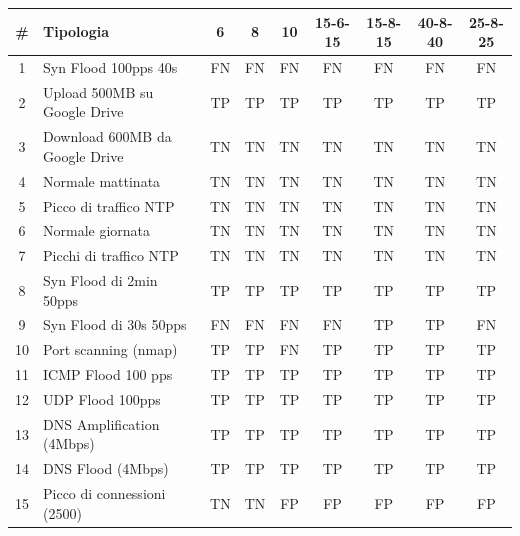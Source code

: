 \FloatBarrier
\begin{table}
    \begin{tabularx}{\textwidth}{||c X c c c c c c c||} 
        \hline
        \# & Tipologia & 6 & 8 & 10 & 15-6-15 & 15-8-15 & 40-8-40 & 25-8-25\\ [0.5ex] 
        \hline\hline
        1 & Syn Flood 100pps 40s & \cellcolor{magenta} FN & \cellcolor{magenta} FN & \cellcolor{magenta} FN & \cellcolor{magenta} FN & \cellcolor{magenta} FN & \cellcolor{magenta} FN & \cellcolor{magenta} FN\\ 
        \hline
        2 & Upload 500MB su Google Drive & TP & TP & TP & TP & TP & TP & TP \\ 
        \hline
        3 &  Download 600MB da Google Drive & TN  & TN & TN & TN & TN & TN & TN\\ 
        \hline 
        4 & Normale mattinata & TN & TN & TN & TN & TN & TN & TN\\
        \hline
        5 & Picco di traffico NTP & TN & TN & TN & TN & TN & TN & TN\\
        \hline
        6 & Normale giornata & TN & TN & TN & TN & TN & TN & TN\\ 
        \hline
        7 & Picchi di traffico NTP & TN & TN & TN & TN & TN & TN & TN \\ 
        \hline 
        8 & Syn Flood di 2min 50pps & TP & TP & TP & TP & TP & TP & TP\\
        \hline
        9 & Syn Flood di 30s 50pps & \cellcolor{magenta} FN & \cellcolor{magenta} FN & \cellcolor{magenta} FN & \cellcolor{magenta} FN & TP & TP & \cellcolor{magenta} FN \\        
        \hline
        10 & Port scanning (nmap) & TP & TP & \cellcolor{magenta} FN & TP & TP & TP & TP  \\
        \hline
        11 & ICMP Flood 100 pps & TP & TP & TP & TP & TP & TP & TP\\
        \hline
        12 & UDP Flood 100pps & TP & TP & TP & TP & TP & TP & TP\\ 
        \hline
        13 & DNS Amplification (4Mbps) & TP & TP & TP & TP & TP & TP & TP\\ 
        \hline 
        14 & DNS Flood (4Mbps) & TP & TP & TP & TP & TP & TP & TP\\
        \hline
        15 & Picco di connessioni (2500) & TN & TN & \cellcolor{orange} FP & \cellcolor{orange} FP & \cellcolor{orange} FP & \cellcolor{orange} FP & \cellcolor{orange} FP\\        

\end{tabularx}
\end{table}
